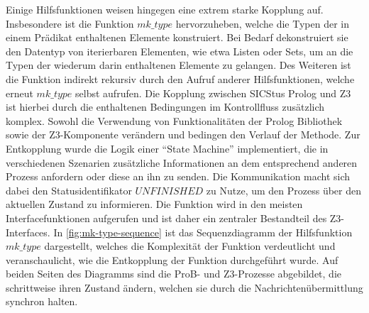 Einige Hilfsfunktionen weisen hingegen eine extrem starke Kopplung auf.
Insbesondere ist die Funktion $mk\_type$ hervorzuheben, welche die Typen der in einem Prädikat enthaltenen Elemente konstruiert.
Bei Bedarf dekonstruiert sie den Datentyp von iterierbaren Elementen, wie etwa Listen oder Sets, um an die Typen der wiederum darin enthaltenen Elemente zu gelangen.
Des Weiteren ist die Funktion indirekt rekursiv durch den Aufruf anderer Hilfsfunktionen, welche erneut $mk\_type$ selbst aufrufen.
Die Kopplung zwischen SICStus Prolog und Z3 ist hierbei durch die enthaltenen Bedingungen im Kontrollfluss zusätzlich komplex.
Sowohl die Verwendung von Funktionalitäten der Prolog Bibliothek sowie der Z3-Komponente verändern und bedingen den Verlauf der Methode.
Zur Entkopplung wurde die Logik einer \enquote{State Machine} implementiert, die in verschiedenen Szenarien zusätzliche Informationen
an dem entsprechend anderen Prozess anfordern oder diese an ihn zu senden.
Die Kommunikation macht sich dabei den Statusidentifikator $UNFINISHED$ zu Nutze, um den Prozess über den aktuellen Zustand zu informieren.
Die Funktion wird in den meisten Interfacefunktionen aufgerufen und ist daher ein zentraler Bestandteil des Z3-Interfaces.
In \cref{fig:mk-type-sequence} ist das Sequenzdiagramm der Hilfsfunktion $mk\_type$ dargestellt, welches die Komplexität der Funktion verdeutlicht
und veranschaulicht, wie die Entkopplung der Funktion durchgeführt wurde.
Auf beiden Seiten des Diagramms sind die ProB- und Z3-Prozesse abgebildet, die schrittweise ihren Zustand ändern, welchen sie durch die Nachrichtenübermittlung synchron halten.

